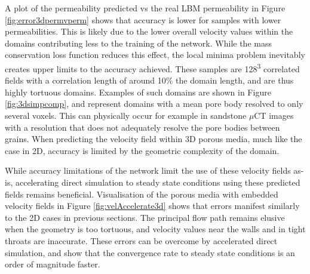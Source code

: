 \documentclass{article}
\begin{document}
A plot of the permeability predicted vs the real LBM permeability in Figure \ref{fig:error3dpermvperm} shows that accuracy is lower for samples with lower permeabilities. This is likely due to the lower overall velocity values within the domains contributing less to the training of the network. While the mass conservation loss function reduces this effect, the local minima problem inevitably creates upper limits to the accuracy achieved. These samples are 128\textsuperscript{3} correlated fields with a correlation length of around 10\% the domain length, and are thus highly tortuous domains. Examples of such domains are shown in Figure \ref{fig:3dsimpcomp}, and represent domains with a mean pore body resolved to only several voxels. This can physically occur for example in sandstone $\mu$CT images with a resolution that does not adequately resolve the pore bodies between grains. When predicting the velocity field within 3D porous media, much like the case in 2D, accuracy is limited by the geometric complexity of the domain. 

While accuracy limitations of the network limit the use of these velocity fields as-is, accelerating direct simulation to steady state conditions using these predicted fields remains beneficial. Visualisation of the porous media with embedded velocity fields in Figure \ref{fig:velAccelerate3d} shows that errors manifest similarly to the 2D cases in previous sections. The principal flow path remains elusive when the geometry is too tortuous, and velocity values near the walls and in tight throats are inaccurate. These errors can be overcome by accelerated direct simulation, and show that the convergence rate to steady state conditions is an order of magnitude faster. 
\end{document}
